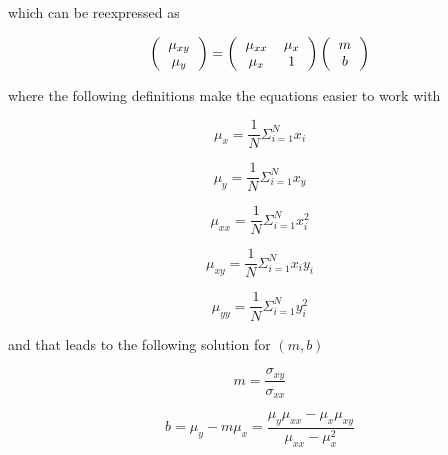 \documentclass{article}
\newcommand{\meanx}{\ensuremath{\mu_{x}}}
\newcommand{\meany}{\ensuremath{\mu_{y}}}
\newcommand{\meanxx}{\ensuremath{\mu_{xx}}}
\newcommand{\meanxy}{\ensuremath{\mu_{xy}}}
\newcommand{\meanyy}{\ensuremath{\mu_{yy}}}
\newcommand{\sxx}{\ensuremath{\sigma_{xx}}}
\newcommand{\sxy}{\ensuremath{\sigma_{xy}}}
\begin{document}
which can be reexpressed as

\begin{equation}
\left(
\begin{tabular}{c}
$\meanxy$ \\
$\meany$
\end{tabular}
\right) = 
\left(
\begin{tabular}{cc}
$ \meanxx $ & $ \meanx $ \\
$ \meanx $ & 1 \\
\end{tabular}
\right)
\left(
\begin{tabular}{c}
$m$ \\
$b$
\end{tabular}
\right)
\end{equation}

where the following definitions make the equations easier to work with

\begin{equation}
\meanx = \dfrac{1}{N} \Sigma_{i=1}^{N} x_{i}
\end{equation}

\begin{equation}
\meany = \dfrac{1}{N} \Sigma_{i=1}^{N} x_{y}
\end{equation}

\begin{equation}
\meanxx = \dfrac{1}{N} \Sigma_{i=1}^{N} x_{i}^{2}
\end{equation}

\begin{equation}
\meanxy = \dfrac{1}{N} \Sigma_{i=1}^{N} x_{i} y_{i}
\end{equation}

\begin{equation}
\meanyy = \frac{1}{N} \Sigma_{i=1}^{N} y_{i}^{2}
\end{equation}

and that leads to the following solution for $ \left( m, b \right)$

\begin{equation}
m = \frac{\sxy}{\sxx}
\end{equation}

\begin{equation}
b = \meany - m \meanx = \frac{\meany \meanxx - \meanx \meanxy}{\mu_{xx} - \mu_{x}^{2}}
\end{equation}

\end{document}
